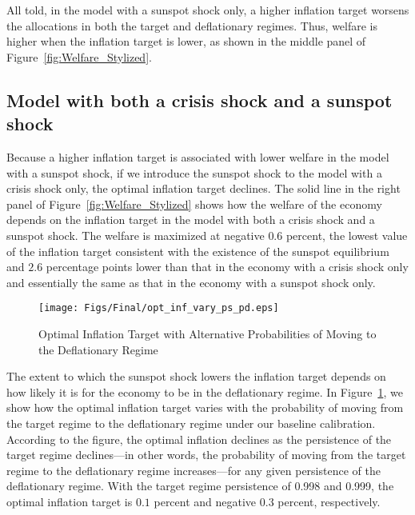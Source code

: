\documentclass[11pt]{article}
\begin{document}
	All told, in the model with a sunspot shock only, a higher inflation target worsens the allocations in both the target and deflationary regimes. Thus, welfare is higher when the inflation target is lower, as shown in the middle panel of Figure~\ref{fig:Welfare_Stylized}.

	\subsection{Model with both a crisis shock and a sunspot shock}

	Because a higher inflation target is associated with lower welfare in the model with a sunspot shock, if we introduce the sunspot shock to the model with a crisis shock only, the optimal inflation target declines. The solid line in the right panel of Figure~\ref{fig:Welfare_Stylized} shows how the welfare of the economy depends on the inflation target in the model with both a crisis shock and a sunspot shock. The welfare is maximized at negative $0.6$ percent, the lowest value of the inflation target consistent with the existence of the sunspot equilibrium and $2.6$ percentage points lower than that in the economy with a crisis shock only and essentially the same as that in the economy with a sunspot shock only.

	\begin{figure}[!h]
		\begin{center}
			\caption{Optimal Inflation Target with Alternative Probabilities of Moving to the Deflationary Regime\label{fig:OptimalPiTarg_Stylized}}
			\texttt{[image: Figs/Final/opt\_inf\_vary\_ps\_pd.eps]}\\
		\end{center}
	\end{figure}

	The extent to which the sunspot shock lowers the inflation target depends on how likely it is for the economy to be in the deflationary regime. In Figure~\ref{fig:OptimalPiTarg_Stylized}, we show how the optimal inflation target varies with the probability of moving from the target regime to the deflationary regime under our baseline calibration. According to the figure, the optimal inflation declines as the persistence of the target regime declines---in other words, the probability of moving from the target regime to the deflationary regime increases---for any given persistence of the deflationary regime. With the target regime persistence of 0.998 and 0.999, the optimal inflation target is $0.1$ percent and negative $0.3$ percent, respectively. %
\end{document}
